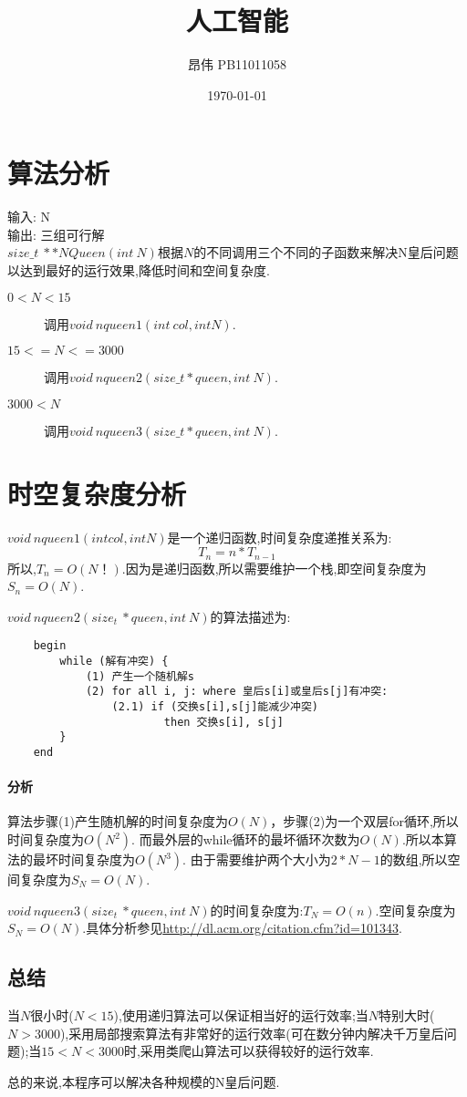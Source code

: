\documentclass[4paper,10pt]{paper}
\title{人工智能 \\ 
	\center{实验一  $N$皇后问题}}
\author{昂伟 PB11011058}
\date{ \today }
\begin{document}
\maketitle
\section*{算法分析}
	\noindent 输入: N \\
	输出: 三组可行解 \\
	$size\_t\  **NQueen(int\ N)$根据$N$的不同调用三个不同的子函数来解决N皇后问题以达到最好的运行效果,降低时间和空间复杂度.

	\begin{description}
	\item[$0< N < 15$] 调用$void\ nqueen1(int\ col, int N)$.
	\item[$15 <= N <= 3000$] 调用$void\ nqueen2(size\_t *queen, int\ N)$.
	\item[$3000 < N$] 调用$void\ nqueen3(size\_t *queen, int\ N)$.
	\end{description}
	
\section*{时空复杂度分析}
	\begin{description}
		\item $void\ nqueen1(int col, int N)$是一个递归函数,时间复杂度递推关系为:$$T_n = n * T_{n - 1}$$
		所以,$T_n = O(N！)$.因为是递归函数,所以需要维护一个栈,即空间复杂度为$S_n = O(N)$.
		
		\item $void\ nqueen2(size_t\ *queen, int\ N)$的算法描述为:
		\begin{lstlisting}
	begin 
		while (解有冲突) {
			(1) 产生一个随机解s
			(2) for all i, j: where 皇后s[i]或皇后s[j]有冲突:
				(2.1) if (交换s[i],s[j]能减少冲突)
						then 交换s[i], s[j]
		}
	end 
		\end{lstlisting}
		\paragraph{分析}{算法步骤(1)产生随机解的时间复杂度为$O(N)$，步骤(2)为一个双层for循环,所以时间复杂度为$O(N^2)$.
		而最外层的while循环的最坏循环次数为$O(N)$.所以本算法的最坏时间复杂度为$O(N^3)$.
		由于需要维护两个大小为$2 * N - 1$的数组,所以空间复杂度为$S_N = O(N)$.}
		
		\item $void\ nqueen3(size_t\ *queen, int\ N)$的时间复杂度为:$T_N = O(n)$.空间复杂度为$S_N = O(N)$.具体分析参见\href{http://dl.acm.org/citation.cfm?id=101343}{http://dl.acm.org/citation.cfm?id=101343}.
	\end{description}
	
	\subsection*{总结}
	当$N$很小时($N<15$),使用递归算法可以保证相当好的运行效率;当$N$特别大时($N > 3000$),采用局部搜索算法有非常好的运行效率(可在数分钟内解决千万皇后问题);当$15<N<3000$时,采用类爬山算法可以获得较好的运行效率.
	
	总的来说,本程序可以解决各种规模的N皇后问题.
\end{document}
